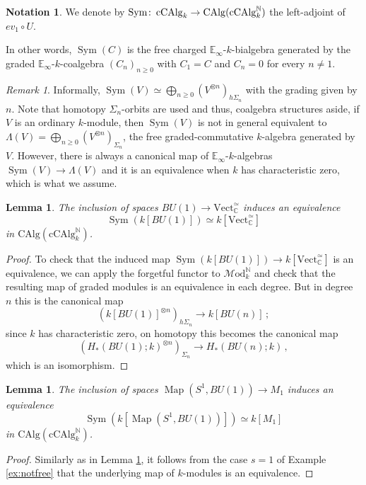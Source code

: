 \documentclass[oneside, a4paper, 12pt]{article}
\numberwithin{equation}{section}
\DeclareMathOperator{\Sym}{Sym}
\newcommand{\Mod}{\mathcal{M}\mathrm{od}}
\newcommand{\CAlg}{\mathrm{CAlg}}
\newcommand{\cCAlg}{\mathrm{cCAlg}}
\newcommand{\C}{\mathbb{C}}
\newcommand{\N}{\mathbb{N}}
\newcommand{\Vect}{\mathrm{Vect}}
\newcommand{\Map}{\operatorname{Map}}
\newcommand{\co}{\colon\thinspace}
\theoremstyle{plain}
\newtheorem{lemma}[theorem]{Lemma}
\theoremstyle{definition}
\newtheorem{notation}[theorem]{Notation}
\theoremstyle{remark}
\newtheorem{remark}[theorem]{Remark}
\begin{document}
\begin{notation} \label{not:sym}
We denote by $\Sym \co \cCAlg_k \to \CAlg(\cCAlg_k^\N)$ the left-adjoint of $ev_1\circ U$.
\end{notation}

In other words, $\Sym(C)$ is the free charged $\mathbb{E}_\infty$-$k$-bialgebra generated by the graded $\mathbb{E}_\infty$-$k$-coalgebra $(C_n)_{n\geq 0}$ with $C_1=C$ and $C_n=0$ for every $n\neq 1$.

\begin{remark}
Informally, $\Sym(V)\simeq \bigoplus_{n\geq 0} (V^{\otimes n})_{h\Sigma_n}$ with the grading given by $n$. Note that homotopy $\Sigma_n$-orbits are used and thus, coalgebra structures aside, if $V$ is an ordinary $k$-module, then $\Sym(V)$ is not in general equivalent to $\Lambda (V)=\bigoplus_{n\geq 0} (V^{\otimes n})_{\Sigma_n}$, the free graded-commutative $k$-algebra generated by $V$. However, there is always a canonical map of $\mathbb{E}_\infty$-$k$-algebras $\Sym(V)\to \Lambda (V)$ and it is an equivalence when $k$ has characteristic zero, which is what we assume.
\end{remark}


\begin{lemma} \label{lem:free}
The inclusion of spaces $BU(1) \to \Vect_{\C}^{\simeq}$ induces an equivalence
\[
\Sym(k[BU(1)])\simeq k[\Vect_{\C}^{\simeq}]
\]
in $\CAlg(\cCAlg_k^\N)$.
\end{lemma}
\begin{proof}
To check that the induced map $\Sym(k[BU(1)])\to k[\Vect_{\C}^{\simeq}]$ is an equivalence, we can apply the forgetful functor to $\Mod_k^\N$ and check that the resulting map of graded modules is an equivalence in each degree. But in degree $n$ this is the canonical map
\[
(k[BU(1)]^{\otimes n})_{h\Sigma_n} \to k[BU(n)]\,;
\]
since $k$ has characteristic zero, on homotopy this becomes the canonical map
\[
(H_\ast(BU(1);k)^{\otimes n})_{\Sigma_n} \to H_\ast(BU(n);k)\,,
\]
which is an isomorphism.
\end{proof}

\begin{lemma} \label{lem:free2}
The inclusion of spaces $\Map(S^1,BU(1)) \to M_1$ induces an equivalence
\[
\Sym(k[\Map(S^1,BU(1))])\simeq k[M_1]
\]
in $\CAlg(\cCAlg_k^\N)$.
\end{lemma}
\begin{proof}
Similarly as in Lemma \ref{lem:free}, it follows from the case $s=1$ of Example \ref{ex:notfree} that the underlying map of $k$-modules is an equivalence.
\end{proof}
\end{document}
